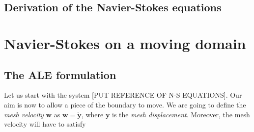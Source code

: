 \documentclass[11pt,a4paper,titlepage]{report}
\begin{document}

%
%
%
%
%


\subsection{Derivation of the Navier-Stokes equations}


\section{Navier-Stokes on a moving domain}


\subsection{The ALE formulation}
Let us start with the system [PUT REFERENCE OF N-S EQUATIONS]. Our aim is now to allow a piece of the boundary to move. We are going to define the \textit{mesh velocity} $\mathbf{w}$ as $\mathbf{w} = \dot{\mathbf{y}}$, where $\mathbf{y}$ is the \textit{mesh displacement}. Moreover, the mesh velocity will have to satisfy 
\end{document}
